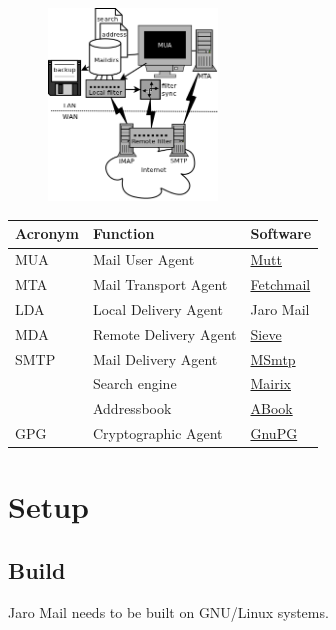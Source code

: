 \documentclass[a4,onecolumn,portrait]{article}
\begin{document}
\begin{figure}
  \begin{center}
    \includegraphics[width=0.4\textwidth]{jaromail-diagram.png}
  \end{center}
\end{figure}
\begin{center}
\begin{tabular}{lll}
Acronym & Function & Software\\
\hline
MUA & Mail User Agent & \href{http://www.mutt.org}{Mutt}\\
MTA & Mail Transport Agent & \href{http://www.fetchmail.info}{Fetchmail}\\
LDA & Local Delivery Agent & Jaro Mail\\
MDA & Remote Delivery Agent & \href{http://en.wikipedia.org/wiki/Sieve_(mail_filtering_language)}{Sieve}\\
SMTP & Mail Delivery Agent & \href{http://msmtp.sourceforge.net}{MSmtp}\\
 & Search engine & \href{http://www.rpcurnow.force9.co.uk/mairix/}{Mairix}\\
 & Addressbook & \href{http://abook.sf.net}{ABook}\\
GPG & Cryptographic Agent & \href{http://www.gnupg.org}{GnuPG}\\
\end{tabular}
\end{center}

\pagebreak
\section{Setup}
\label{sec-3}

\subsection{Build}
\label{sec-3-1}

Jaro Mail needs to be built on GNU/Linux systems.
\end{document}
